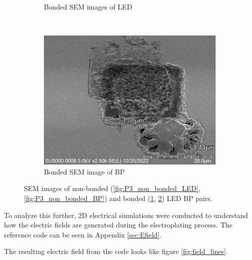 \begin{figure}
\begin{subfigure}[c]{0.45\textwidth}
        \caption{Bonded SEM images of LED}
        \label{fig:P3_bonded_LED}
    \end{subfigure}
    ~
    \begin{subfigure}[c]{0.45\textwidth}
        \includegraphics[width=\textwidth]{Main/Ch4/Phase-4/P4-T02/BP/IMG_No0006.png}
        \caption{Bonded SEM image of BP}
        \label{fig:P3_bonded_BP}
    \end{subfigure}
    \caption{SEM images of non-bonded (\ref{fig:P3_non_bonded_LED}, \ref{fig:P3_non_bonded_BP}) and bonded (\ref{fig:P3_bonded_LED}, \ref{fig:P3_bonded_BP}) LED BP pairs.}
    \label{fig:P3_SEM_All}
\end{figure}

To analyze this further, 2D electrical simulations were conducted to understand how the electric fields are generated during the electroplating process. The reference code can be seen in Appendix \ref{sec:Efield}.

The resulting electric field from the code looks like figure \ref{fig:field_lines}.



